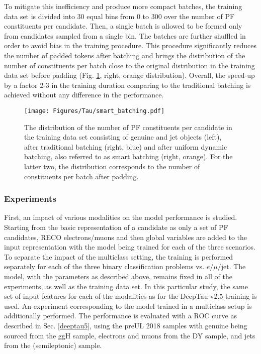 To mitigate this inefficiency and produce more compact batches, the training data set is divided into 30 equal bins from 0 to 300 over the number of PF constituents per \tauh candidate. Then, a single batch is allowed to be formed only from \tauh candidates sampled from a single bin. The batches are further shuffled in order to avoid bias in the training procedure. This procedure significantly reduces the number of padded tokens after batching and brings the distribution of the number of constituents per batch close to the original distribution in the training data set before padding (Fig. \ref{fig:smart_batching}, right, orange distribution). Overall, the speed-up by a factor 2-3 in the training duration comparing to the traditional batching is achieved without any difference in the performance. 
\begin{figure}[ht!]
    \centering
    \texttt{[image: Figures/Tau/smart\_batching.pdf]}
    \caption{The distribution of the number of PF constituents per \tauh candidate in the training data set consisting of genuine \tauh and jet objects (left), after traditional batching (right, blue) and after uniform dynamic batching, also referred to as smart batching (right, orange). For the latter two, the distribution corresponds to the number of constituents per batch after padding.}
    \label{fig:smart_batching}
\end{figure}

\subsubsection{Experiments}

First, an impact of various modalities on the model performance is studied. Starting from the basic representation of a \tauh candidate as only a set of PF candidates, RECO electrons/muons and then global variables are added to the input representation with the model being trained for each of the three scenarios. To separate the impact of the multiclass setting, the training is performed separately for each of the three binary classification problems \tauh vs. $e/\mu/\text{jet}$. The model, with the parameters as described above, remains fixed in all of the experiments, as well as the training data set. In this particular study, the same set of input features for each of the modalities as for the DeepTau v2.5 training is used. An experiment corresponding to the model trained in a multiclass setup is additionally performed. The performance is evaluated with a ROC curve as described in Sec. \ref{deeptau5}, using the preUL 2018 samples with genuine \tauh being sourced from the ggH sample, electrons and muons from the DY sample, and jets from the \ttbar (semileptonic) sample. 

